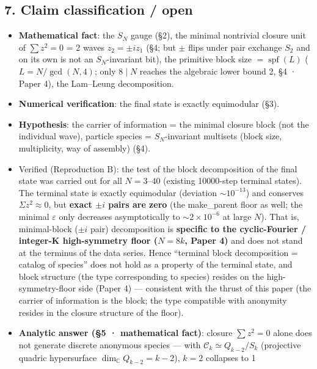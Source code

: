 \documentclass[
  a4paper,
]{ltjsarticle}
\providecommand{\tightlist}{%
  \setlength{\itemsep}{0pt}\setlength{\parskip}{0pt}}
\begin{document}
\subsection{7. Claim classification /
open}\label{claim-classification-open}

\begin{itemize}
\tightlist
\item
  \textbf{Mathematical fact}: the \(S_N\) gauge (§2), the minimal
  nontrivial closure unit of \(\sum z^2=0\) = 2 waves \(z_2=\pm i z_1\)
  (§4; but \(\pm\) flips under pair exchange \(S_2\) and on its own is
  not an \(S_N\)-invariant bit), the primitive block size
  \(=\operatorname{spf}(L)\) (\(L=N/\gcd(N,4)\); only \(8\mid N\)
  reaches the algebraic lower bound 2, §4 · Paper 4), the Lam--Leung
  decomposition.
\item
  \textbf{Numerical verification}: the final state is exactly
  equimodular (§3).
\item
  \textbf{Hypothesis}: the carrier of information = the minimal closure
  block (not the individual wave), particle species = \(S_N\)-invariant
  multisets (block size, multiplicity, way of assembly) (§4).
\item
  Verified (Reproduction B): the test of the block decomposition of the
  final state was carried out for all \(N=3\)--\(40\) (existing
  10000-step terminal states). The terminal state is exactly equimodular
  (deviation \(\sim10^{-13}\)) and conserves \(\Sigma z^2\approx0\), but
  \textbf{exact \(\pm i\) pairs are zero} (the make\_parent floor as
  well; the minimal \(\varepsilon\) only decreases asymptotically to
  \(\sim2\times10^{-6}\) at large \(N\)). That is, minimal-block
  (\(\pm i\) pair) decomposition is \textbf{specific to the
  cyclic-Fourier / integer-K high-symmetry floor (\(N=8k\), Paper 4)}
  and does not stand at the terminus of the data series. Hence
  ``terminal block decomposition = catalog of species'' does not hold as
  a property of the terminal state, and block structure (the type
  corresponding to species) resides on the high-symmetry-floor side
  (Paper 4) --- consistent with the thrust of this paper (the carrier of
  information is the block; the type compatible with anonymity resides
  in the closure structure of the floor).
\item
  \textbf{Analytic answer (§5 · mathematical fact)}: closure
  \(\sum z^2=0\) alone does not generate discrete anonymous species ---
  with \(\mathcal C_k\simeq Q_{k-2}/S_k\) (projective quadric
  hypersurface \(\dim_{\mathbb C}Q_{k-2}=k-2\)), \(k=2\) collapses to 1

\end{itemize}
\end{document}
